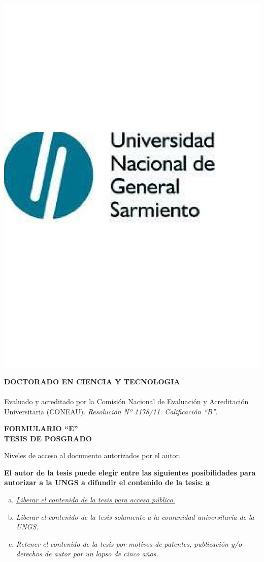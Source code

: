 
\begin{flushright}
	\includegraphics[width=0.33\linewidth]{../../Logos/LogoUNGS.pdf}
\end{flushright}

	\begin{center}
		\textbf{DOCTORADO EN CIENCIA Y TECNOLOGIA}\vspace{-3mm}\\
		\hrulefill\\
		{\small {Evaluado y acreditado por la Comisión Nacional de Evaluación y Acreditación Universitaria (CONEAU). \emph{Resolución Nº 1178/11. Calificación “B”}.}}
	\end{center}
\vspace{2mm}
\begin{center}
	\textbf{FORMULARIO “E”} \\
	\textbf{TESIS DE POSGRADO}
\end{center}
\bigskip
\noindent Niveles de acceso al documento autorizados por el autor.

\textbf{El autor de la tesis puede elegir entre las siguientes posibilidades para autorizar  a la UNGS a difundir el contenido de la tesis: \underline{a}}
\begin{enumerate}[a)]
	\item \textit{\underline{Liberar el contenido de la tesis para acceso público.}}
	\item \textit{Liberar el contenido de la tesis solamente a la comunidad universitaria de la UNGS.}
	\item \textit{Retener el contenido de la tesis por motivos de patentes, publicación y/o derechos de autor por un lapso de cinco años.}
\end{enumerate}

